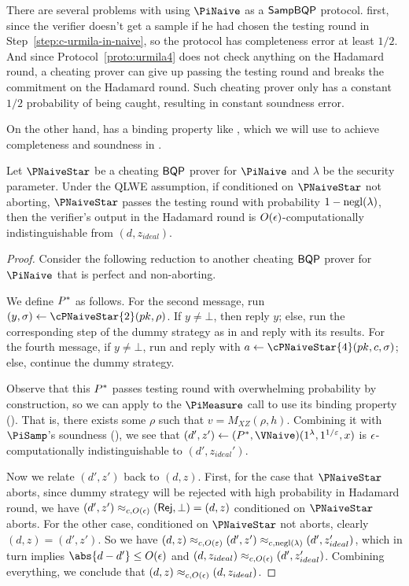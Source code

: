 There are several problems with using $\PiNaive$ as a $\operatorname{\mathsf{SampBQP}}$ protocol. first, since the verifier doesn't get a sample if he had chosen the testing round in Step~\ref{step:c-urmila-in-naive}, so the protocol has  completeness error at least $1/2$. And since Protocol~\ref{proto:urmila4} does not check anything on the Hadamard round, a cheating prover can give up passing the testing round and breaks the commitment on the Hadamard round. Such cheating prover only has a constant $1/2$ probability of being caught, resulting in constant soundness error.

On the other hand,  has a binding property like , which we will use to achieve completeness and soundness in .

\begin{lemma}
	\label{lem:naive-qpip0-binding}
	Let $\PNaiveStar$ be a cheating $\operatorname{\mathsf{BQP}}$ prover for $\PiNaive$ and $\lambda$ be the security parameter.
	Under the QLWE assumption, if conditioned on $\PNaiveStar$ not aborting, $\PNaiveStar$ passes the testing round with probability $1-\operatorname{negl}(\lambda)$,
	then the verifier's output in the Hadamard round is $O(\epsilon)$-computationally indistinguishable from $(d, z_{ideal})$.
\end{lemma}
\begin{proof}
	Consider the following reduction to another cheating $\operatorname{\mathsf{BQP}}$ prover for $\PiNaive$ that is perfect and non-aborting.

	We define $P^*$ as follows.
	For the second message, run $(y, \sigma)\leftarrow\cPNaiveStar{2}(pk, \rho)$.
	If $y\ne\bot$, then reply $y$;
	else, run the corresponding step of the dummy strategy as in  and reply with its results.
	For the fourth message, if $y\ne\bot$, run and reply with $a\leftarrow\cPNaiveStar{4}(pk, c, \sigma)$;
	else, continue the dummy strategy.

	Observe that this $P^*$ passes testing round with overwhelming probability by construction,
	so we can apply  to the $\PiMeasure$ call to use its binding property ().
	That is, there exists some $\rho$ such that $v=M_{XZ}(\rho, h)$.
	Combining it with $\PiSamp$'s soundness (),
	we see that $(d', z')\leftarrow(\Pstar, \VNaive)(1^\lambda, 1^{1/\varepsilon}, x)$ is $\epsilon$-computationally indistinguishable to $(d', z_{ideal}')$.

	Now we relate $(d', z')$ back to $(d, z)$.
	First, for the case that $\PNaiveStar$ aborts, since dummy strategy will be rejected with high probability in Hadamard round,
	we have $(d', z')\approx_{c, O(\epsilon)}(\mathsf{Rej}, \bot)=(d, z)$ conditioned on $\PNaiveStar$ aborts.
	For the other case, conditioned on $\PNaiveStar$ not aborts, clearly $(d, z)=(d', z')$.
	So we have $(d, z)\approx_{c, O(\varepsilon)}(d', z')\approx_{c, \operatorname{negl}(\lambda)}(d', z_{ideal}')$,
	which in turn implies $\abs{d-d'}\leq O(\eps)$
	and $(d, z_{ideal})\approx_{c, O(\epsilon)}(d', z_{ideal}')$.
	Combining everything, we conclude that $(d, z)\approx_{c, O(\epsilon)}(d, z_{ideal})$.
\end{proof}

